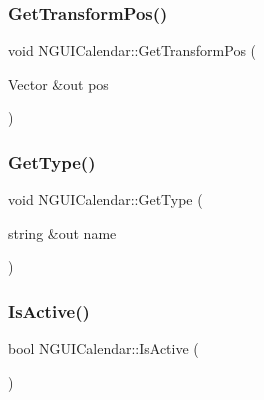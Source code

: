 \hypertarget{class_n_g_u_i_calendar_aeda181a3802c06043e0fcdfa17d02a1e}{}\label{class_n_g_u_i_calendar_aeda181a3802c06043e0fcdfa17d02a1e} 
\subsubsection{\texorpdfstring{Get\+Transform\+Pos()}{GetTransformPos()}}
{\footnotesize\ttfamily void N\+G\+U\+I\+Calendar\+::\+Get\+Transform\+Pos (\begin{DoxyParamCaption}\item[{Vector \&out}]{pos }\end{DoxyParamCaption})}

\hypertarget{class_n_g_u_i_calendar_a7d49c34fa1f2b8f78f391fa5cda0048a}{}\label{class_n_g_u_i_calendar_a7d49c34fa1f2b8f78f391fa5cda0048a} 
\subsubsection{\texorpdfstring{Get\+Type()}{GetType()}}
{\footnotesize\ttfamily void N\+G\+U\+I\+Calendar\+::\+Get\+Type (\begin{DoxyParamCaption}\item[{string \&out}]{name }\end{DoxyParamCaption})}

\hypertarget{class_n_g_u_i_calendar_a9996bb93328854e08e853038da0a9b9b}{}\label{class_n_g_u_i_calendar_a9996bb93328854e08e853038da0a9b9b} 
\subsubsection{\texorpdfstring{Is\+Active()}{IsActive()}}
{\footnotesize\ttfamily bool N\+G\+U\+I\+Calendar\+::\+Is\+Active (\begin{DoxyParamCaption}{ }\end{DoxyParamCaption})}

\hypertarget{class_n_g_u_i_calendar_a1ec8c5a588d4dac1163780f853fc8821}{}\label{class_n_g_u_i_calendar_a1ec8c5a588d4dac1163780f853fc8821} 

